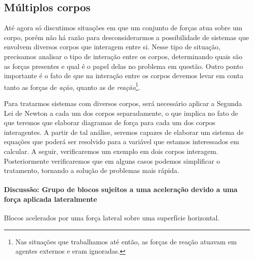 \subsection{Múltiplos corpos}

Até agora só discutimos situações em que um conjunto de forças atua sobre um corpo, porém não há razão para desconsiderarmos a possibilidade de sistemas que envolvem diversos corpos que interagem entre si. Nesse tipo de situação, precisamos analisar o tipo de interação entre os corpos, determinando quais são as forças presentes e qual é o papel delas no problema em questão. Outro ponto importante é o fato de que na interação entre os corpos devemos levar em conta tanto as forças de \emph{ação}, quanto as de \emph{reação}\footnote{Nas situações que trabalhamos até então, as forças de reação atuavam em agentes externos e eram ignoradas.}.

Para tratarmos sistemas com diversos corpos, será necessário aplicar a Segunda Lei de Newton a cada um dos corpos separadamente, o que implica no fato de que teremos que elaborar diagramas de força para cada um dos corpos interagentes. A partir de tal análise, seremos capazes de elaborar um sistema de equações que poderá ser resolvido para a variável que estamos interessados em calcular. A seguir, verificaremos um exemplo em dois corpos interagem. Posteriormente verificaremos que em alguns casos podemos simplificar o tratamento, tornando a solução de problemas mais rápida.

\paragraph{Discussão: Grupo de blocos sujeitos a uma aceleração devido a uma força aplicada lateralmente}

\begin{marginfigure}
\centering
{}
\caption{Blocos acelerados por uma força lateral sobre uma superfície horizontal. \label{Fig:AcelBlocosPorForcaLateral}}
\end{marginfigure}

